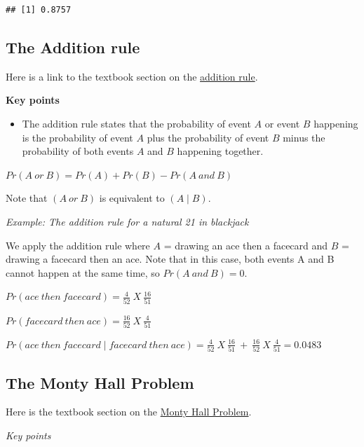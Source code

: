 \documentclass[
]{article}
\providecommand{\tightlist}{%
  \setlength{\itemsep}{0pt}\setlength{\parskip}{0pt}}
\begin{document}
\begin{verbatim}
## [1] 0.8757
\end{verbatim}

\hypertarget{the-addition-rule}{%
\subsection{The Addition rule}\label{the-addition-rule}}

Here is a link to the textbook section on the
\href{https://rafalab.github.io/dsbook/probability.html\#addition-rule}{addition
rule}.

\textbf{Key points}

\begin{itemize}
\tightlist
\item
  The addition rule states that the probability of event \(A\) or event
  \(B\) happening is the probability of event \(A\) plus the probability
  of event \(B\) minus the probability of both events \(A\) and \(B\)
  happening together.
\end{itemize}

\(Pr(A\:or\:B)=Pr(A) + Pr(B) − Pr(A\:and\:B)\)

Note that \((A\:or\:B)\) is equivalent to \((A \mid B)\).

\emph{Example: The addition rule for a natural 21 in blackjack}

We apply the addition rule where \(A\) = drawing an ace then a facecard
and \(B\) = drawing a facecard then an ace. Note that in this case, both
events A and B cannot happen at the same time, so \(Pr(A\:and\:B) = 0\).

\(Pr(ace\:then\:facecard) = \frac{4}{52}\:X\: \frac{16}{51}\)

\(Pr(facecard\:then\:ace) = \frac{16}{52}\:X\: \frac{4}{51}\)

\(Pr(ace\:then\:facecard \mid facecard\:then\:ace) = \frac{4}{52}\:X\: \frac{16}{51}\:+\:\frac{16}{52}\:X\: \frac{4}{51} = 0.0483\)

\hypertarget{the-monty-hall-problem}{%
\subsection{The Monty Hall Problem}\label{the-monty-hall-problem}}

Here is the textbook section on the
\href{https://rafalab.github.io/dsbook/probability.html\#monty-hall-problem}{Monty
Hall Problem}.

\emph{Key points}
\end{document}
